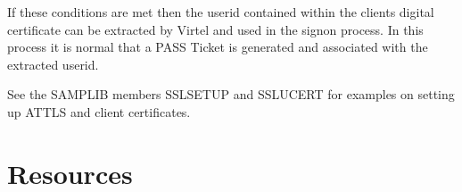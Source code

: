 \documentclass[letterpaper,10pt,english]{sphinxmanual}
\begin{document}
\sphinxAtStartPar
If these conditions are met then the userid contained within the clients digital certificate can be extracted by Virtel and used in the signon process. In this process it is normal that a PASS Ticket is generated and associated with the extracted userid.

\sphinxAtStartPar
See the SAMPLIB members SSLSETUP and SSLUCERT for examples on setting up AT\sphinxhyphen{}TLS and client certificates.

\newpage

\ignorespaces 

\section{Resources}
\label{\detokenize{connectivity_guide:resources}}\label{\detokenize{connectivity_guide:index-168}}
\end{document}
